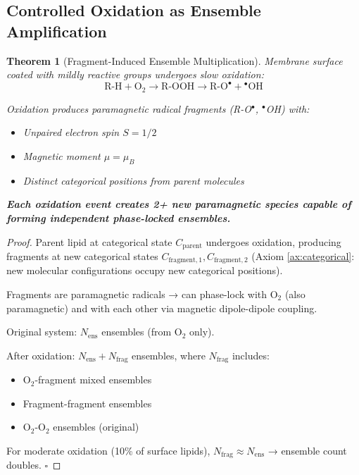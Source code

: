 \documentclass[11pt,a4paper]{article}
\newtheorem{theorem}{Theorem}[section]
\theoremstyle{definition}
\theoremstyle{remark}
\begin{document}
\subsection{Controlled Oxidation as Ensemble Amplification}

\begin{theorem}[Fragment-Induced Ensemble Multiplication]
\label{thm:fragment_amplification}
Membrane surface coated with mildly reactive groups undergoes slow oxidation:
\begin{equation}
\text{R-H} + \text{O}_2 \rightarrow \text{R-OOH} \rightarrow \text{R-O}^\bullet + {}^\bullet\text{OH}
\end{equation}

Oxidation produces paramagnetic radical fragments (R-O$^\bullet$, $^\bullet$OH) with:
\begin{itemize}
\item Unpaired electron spin $S = 1/2$
\item Magnetic moment $\mu = \mu_B$
\item Distinct categorical positions from parent molecules
\end{itemize}

\textbf{Each oxidation event creates 2+ new paramagnetic species capable of forming independent phase-locked ensembles.}
\end{theorem}

\begin{proof}
Parent lipid at categorical state $C_{\text{parent}}$ undergoes oxidation, producing fragments at new categorical states $C_{\text{fragment},1}, C_{\text{fragment},2}$ (Axiom \ref{ax:categorical}: new molecular configurations occupy new categorical positions).

Fragments are paramagnetic radicals → can phase-lock with O$_2$ (also paramagnetic) and with each other via magnetic dipole-dipole coupling.

Original system: $N_{\text{ens}}$ ensembles (from O$_2$ only).

After oxidation: $N_{\text{ens}} + N_{\text{frag}}$ ensembles, where $N_{\text{frag}}$ includes:
\begin{itemize}
\item O$_2$-fragment mixed ensembles
\item Fragment-fragment ensembles
\item O$_2$-O$_2$ ensembles (original)
\end{itemize}

For moderate oxidation (10\% of surface lipids), $N_{\text{frag}} \approx N_{\text{ens}}$ → ensemble count doubles. $\square$
\end{proof}
\end{document}
